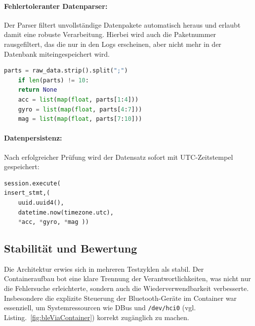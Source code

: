 \paragraph{Fehlertoleranter Datenparser:}

Der Parser filtert unvollständige Datenpakete automatisch heraus und erlaubt damit eine robuste Verarbeitung. Hierbei wird auch die Paketnummer rausgefiltert, das die nur in den Logs erscheinen, aber nicht mehr in der Datenbank miteingespeichert wird.\\

\begin{lstlisting}[language=Python, caption={Datenparser der Sensorwerte}, label=fig:parserSensorvalues]
	parts = raw_data.strip().split(";")
	if len(parts) != 10:
	return None
	acc = list(map(float, parts[1:4]))
	gyro = list(map(float, parts[4:7]))
	mag = list(map(float, parts[7:10]))
\end{lstlisting}

\paragraph{Datenpersistenz:}

Nach erfolgreicher Prüfung wird der Datensatz sofort mit UTC-Zeitstempel gespeichert:

\begin{lstlisting}[language=Python, caption={Speicherung der Sensordaten}, label=fig:sensorvaluesSavings]
session.execute(
insert_stmt,(
	uuid.uuid4(),
	datetime.now(timezone.utc),
	*acc, *gyro, *mag ))
\end{lstlisting}

\subsection{Stabilität und Bewertung}

Die Architektur erwies sich in mehreren Testzyklen als stabil. Der Containeraufbau bot eine klare Trennung der Verantwortlichkeiten, was nicht nur die Fehlersuche erleichterte, sondern auch die Wiederverwendbarkeit verbesserte. Insbesondere die explizite Steuerung der Bluetooth-Geräte im Container war essenziell, um Systemressourcen wie DBus und \texttt{/dev/hci0} (vgl. Listing.~\ref{fig:bleViaContainer}) korrekt zugänglich zu machen.
